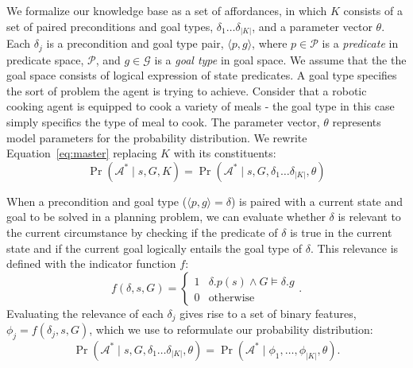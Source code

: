 \documentclass[conference]{IEEEtran}
\newcommand{\dnote}[1]{\textcolor{Green}{\textbf{}}}
\newcommand{\jnote}[1]{\textcolor{Orange}{\textbf{}}}
\begin{document}
We formalize our knowledge base as a set of affordances, in which $K$
consists of a set of paired preconditions and goal types, $\delta_1
\ldots \delta_{|K|}$, and a parameter vector $\theta$.  Each
$\delta_j$ is a precondition and goal type pair, $\langle p, g
\rangle$, where $p \in \mathcal{P}$ is a {\it predicate} in predicate space, 
$\mathcal{P}$, and $g \in \mathcal{G}$ is a {\it goal type} in goal space. 
We assume that the the goal space consists of logical expression of state predicates.
A goal type specifies the sort of problem the agent is trying to achieve. Consider that a robotic
cooking agent is equipped to cook a variety of meals - the goal type in this case simply specifics
the type of meal to cook.
\jnote{Somewhere, maybe here? we should give an example of goals and goal types.
I think it's kind of ambiguous what we mean.} \dnote{how about this?}
The parameter vector, $\theta$ represents model parameters for the probability distribution.
We rewrite Equation~\ref{eq:master} replacing $K$ with its constituents:
\begin{equation}
\Pr(\mathcal{A}^* \mid s, G, K) = \Pr(\mathcal{A}^* \mid s, G, \delta_1 \ldots \delta_{|K|}, \theta)
\end{equation}

When a precondition and goal type ($\langle p , g \rangle = \delta$) is paired with a current state and goal to be solved in a planning problem, we can evaluate whether $\delta$ is relevant to the current circumstance by checking if the predicate of $\delta$ is true in the current state and if the current goal logically entails the goal type of $\delta$. This relevance is defined with the indicator function $f$:
\begin{equation}
f(\delta, s, G) = 
\begin{cases}
1& \delta.p(s) \wedge G \models \delta.g \\
0& \text{otherwise}
\end{cases}.
\label{eq:f_func_def}
\end{equation}
Evaluating the relevance of each $\delta_j$ gives rise to a set of binary features, $\phi_j = f(\delta_j, s, G)$, which we use to reformulate our probability distribution:
\begin{equation}
\Pr(\mathcal{A}^* \mid s, G, \delta_1 \ldots \delta_{|K|}, \theta) = \Pr(\mathcal{A}^* \mid \phi_1, \ldots, \phi_{|K|}, \theta).
\label{eq:feature_rep}
\end{equation}
\end{document}
